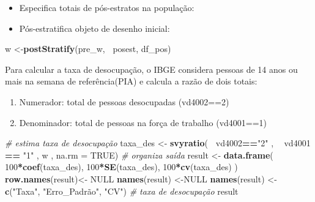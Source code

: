 \documentclass[]{book}
\newenvironment{Shaded}{\begin{snugshade}}{\end{snugshade}}
\newcommand{\KeywordTok}[1]{\textcolor[rgb]{0.13,0.29,0.53}{\textbf{#1}}}
\newcommand{\DataTypeTok}[1]{\textcolor[rgb]{0.13,0.29,0.53}{#1}}
\newcommand{\DecValTok}[1]{\textcolor[rgb]{0.00,0.00,0.81}{#1}}
\newcommand{\StringTok}[1]{\textcolor[rgb]{0.31,0.60,0.02}{#1}}
\newcommand{\CommentTok}[1]{\textcolor[rgb]{0.56,0.35,0.01}{\textit{#1}}}
\newcommand{\OtherTok}[1]{\textcolor[rgb]{0.56,0.35,0.01}{#1}}
\newcommand{\OperatorTok}[1]{\textcolor[rgb]{0.81,0.36,0.00}{\textbf{#1}}}
\newcommand{\NormalTok}[1]{#1}
\providecommand{\tightlist}{%
  \setlength{\itemsep}{0pt}\setlength{\parskip}{0pt}}
\theoremstyle{definition}
\theoremstyle{definition}
\theoremstyle{definition}
\theoremstyle{remark}
\begin{document}
\begin{itemize}
\tightlist
\item
  Especifica totais de pós-estratos na população:
\end{itemize}

\begin{Shaded}
\end{Shaded}

\begin{itemize}
\tightlist
\item
  Pós-estratifica objeto de desenho inicial:
\end{itemize}

\begin{Shaded}
\begin{Highlighting}[]
\NormalTok{w <-}\KeywordTok{postStratify}\NormalTok{(pre_w, }\OperatorTok{~}\NormalTok{posest, df_pos)}
\end{Highlighting}
\end{Shaded}

Para calcular a taxa de desocupação, o IBGE considera pessoas de 14 anos
ou mais na semana de referência(PIA) e calcula a razão de dois totais:

\begin{enumerate}
\def\labelenumi{\arabic{enumi}.}
\item
  Numerador: total de pessoas desocupadas (vd4002==2)
\item
  Denominador: total de pessoas na força de trabalho (vd4001==1)
\end{enumerate}

\begin{Shaded}
\begin{Highlighting}[]
\CommentTok{# estima taxa de desocupação}
\NormalTok{taxa_des <-}\StringTok{ }\KeywordTok{svyratio}\NormalTok{(}\OperatorTok{~}\StringTok{ }\NormalTok{vd4002}\OperatorTok{==}\StringTok{"2"}\NormalTok{ ,}
  \OperatorTok{~}\StringTok{ }\NormalTok{vd4001 }\OperatorTok{==}\StringTok{ "1"}\NormalTok{ , w , }\DataTypeTok{na.rm =} \OtherTok{TRUE}\NormalTok{)}
\CommentTok{# organiza saída}
\NormalTok{result <-}\StringTok{ }\KeywordTok{data.frame}\NormalTok{(}
  \DecValTok{100}\OperatorTok{*}\KeywordTok{coef}\NormalTok{(taxa_des),}
  \DecValTok{100}\OperatorTok{*}\KeywordTok{SE}\NormalTok{(taxa_des), }
  \DecValTok{100}\OperatorTok{*}\KeywordTok{cv}\NormalTok{(taxa_des)}
\NormalTok{)}
\KeywordTok{row.names}\NormalTok{(result)<-}\StringTok{ }\OtherTok{NULL}
\KeywordTok{names}\NormalTok{(result) <-}\OtherTok{NULL}
\KeywordTok{names}\NormalTok{(result) <-}\StringTok{ }\KeywordTok{c}\NormalTok{(}\StringTok{"Taxa"}\NormalTok{, }\StringTok{"Erro_Padrão"}\NormalTok{, }\StringTok{"CV"}\NormalTok{)}
\CommentTok{# taxa de desocupação}
\NormalTok{result}
\end{Highlighting}
\end{Shaded}
\end{document}
